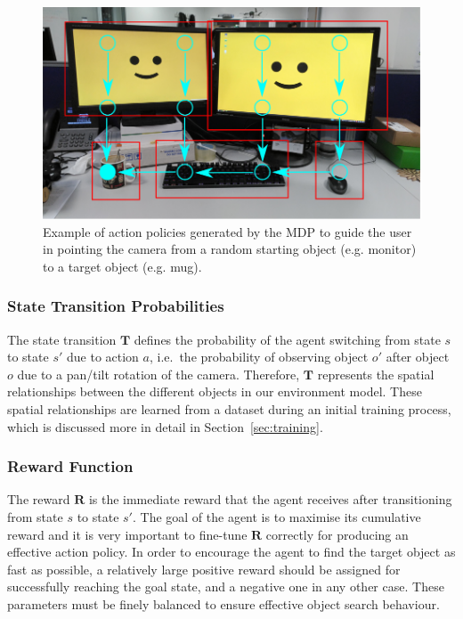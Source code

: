 \documentclass[a4paper, twoside]{article}
\begin{document}
\begin{figure}
  \centering
  \includegraphics[width=\columnwidth]{figures/office_desk_example.png}
  \caption{Example of action policies generated by the MDP to guide the user in pointing the camera from a random starting object (e.g. monitor) to a target object (e.g. mug). }\label{fig:route-example}
\end{figure}

\subsubsection{State Transition Probabilities}

\noindent The state transition $\mathbf{T}$ defines the probability of the agent switching from state $s$ to state $s'$ due to action $a$, i.e.\ the probability of observing object $o'$ after object $o$ due to a pan/tilt rotation of the camera. Therefore, $\mathbf{T}$ represents the spatial relationships between the different objects in our environment model. 
% 
These spatial relationships are learned from a dataset during an initial training process, which is discussed more in detail in Section~\ref{sec:training}.

\subsubsection{Reward Function}

\noindent The reward $\mathbf{R}$ is the immediate reward that the agent receives after transitioning from state $s$ to state $s'$.
% 
% 
The goal of the agent is to maximise its cumulative reward and it is very important to fine-tune $\mathbf{R}$ correctly for producing an effective action policy. In order to encourage the agent to find the target object as fast as possible, a relatively large positive reward should be assigned for successfully reaching the goal state, and a negative one in any other case. These parameters must be finely balanced to ensure effective object search behaviour.
\end{document}
